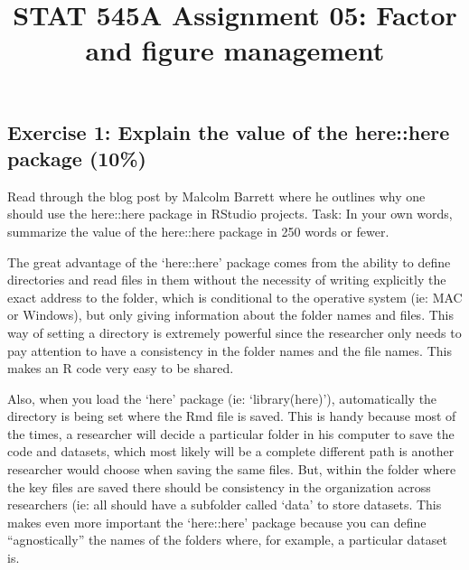 \documentclass[]{article}
\title{STAT 545A Assignment 05: Factor and figure management}
\author{}
\date{}
\newenvironment{Shaded}{\begin{snugshade}}{\end{snugshade}}
\newcommand{\DataTypeTok}[1]{\textcolor[rgb]{0.13,0.29,0.53}{#1}}
\newcommand{\KeywordTok}[1]{\textcolor[rgb]{0.13,0.29,0.53}{\textbf{#1}}}
\newcommand{\NormalTok}[1]{#1}
\newcommand{\OperatorTok}[1]{\textcolor[rgb]{0.81,0.36,0.00}{\textbf{#1}}}
\newcommand{\OtherTok}[1]{\textcolor[rgb]{0.56,0.35,0.01}{#1}}
\begin{document}
\maketitle

\begin{Shaded}
\end{Shaded}

\hypertarget{exercise-1-explain-the-value-of-the-herehere-package-10}{%
\subsection{Exercise 1: Explain the value of the here::here package
(10\%)}\label{exercise-1-explain-the-value-of-the-herehere-package-10}}

Read through the blog post by Malcolm Barrett where he outlines why one
should use the here::here package in RStudio projects. Task: In your own
words, summarize the value of the here::here package in 250 words or
fewer.

The great advantage of the `here::here' package comes from the ability
to define directories and read files in them without the necessity of
writing explicitly the exact address to the folder, which is conditional
to the operative system (ie: MAC or Windows), but only giving
information about the folder names and files. This way of setting a
directory is extremely powerful since the researcher only needs to pay
attention to have a consistency in the folder names and the file names.
This makes an R code very easy to be shared.

Also, when you load the `here' package (ie: `library(here)'),
automatically the directory is being set where the Rmd file is saved.
This is handy because most of the times, a researcher will decide a
particular folder in his computer to save the code and datasets, which
most likely will be a complete different path is another researcher
would choose when saving the same files. But, within the folder where
the key files are saved there should be consistency in the organization
across researchers (ie: all should have a subfolder called `data' to
store datasets. This makes even more important the `here::here' package
because you can define ``agnostically'' the names of the folders where,
for example, a particular dataset is.
\end{document}
